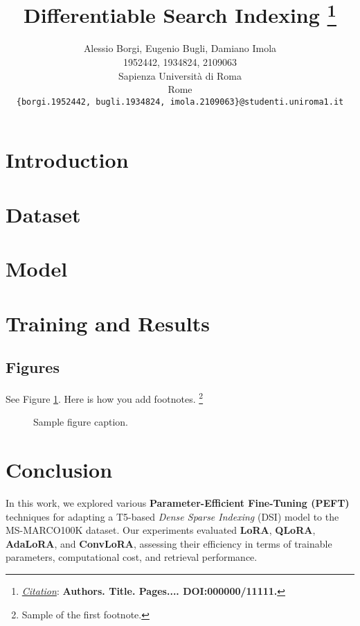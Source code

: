 \documentclass{article}
\title{Differentiable Search Indexing
\thanks{\textit{\underline{Citation}}: 
\textbf{Authors. Title. Pages.... DOI:000000/11111.}} 
}
\author{
  Alessio Borgi, Eugenio Bugli, Damiano Imola \\
  1952442, 1934824, 2109063 \\
  Sapienza Università di Roma \\
  Rome\\
  \texttt{\{borgi.1952442, bugli.1934824, imola.2109063\}@studenti.uniroma1.it} \\
}
\begin{document}
\maketitle

\begin{abstract}

\end{abstract}



\section{Introduction} 
\section{Dataset} 

\section{Model} 
\section{Training and Results} 



\subsection{Figures} 
See Figure \ref{fig:fig1}. Here is how you add footnotes. \footnote{Sample of the first footnote.}

\begin{figure}
  \centering
  \fbox{\rule[-.5cm]{4cm}{4cm} \rule[-.5cm]{4cm}{0cm}}
  \caption{Sample figure caption.}
  \label{fig:fig1}
\end{figure}


\section{Conclusion}
In this work, we explored various \textbf{Parameter-Efficient Fine-Tuning (PEFT)} techniques for adapting a T5-based \textit{Dense Sparse Indexing} (DSI) model to the MS-MARCO100K dataset. Our experiments evaluated \textbf{LoRA}, \textbf{QLoRA}, \textbf{AdaLoRA}, and \textbf{ConvLoRA}, assessing their efficiency in terms of trainable parameters, computational cost, and retrieval performance.
\end{document}

